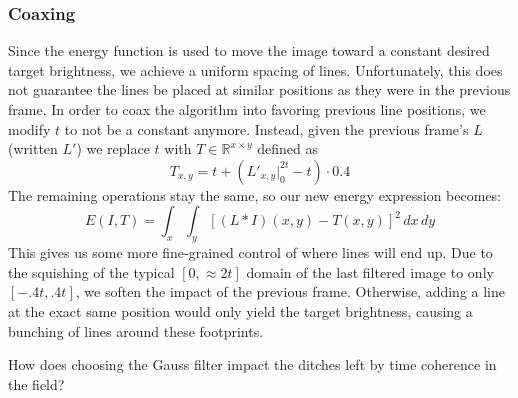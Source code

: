 \subsubsection*{Coaxing}
Since the energy function is used to move the image toward a constant desired target brightness, we achieve a uniform spacing of lines.
Unfortunately, this does not guarantee the lines be placed at similar positions as they were in the previous frame.
In order to coax the algorithm into favoring previous line positions, we modify $t$ to not be a constant anymore.
Instead, given the previous frame's $L$ (written $L'$) we replace $t$ with $T\in\mathbb{R}^{x\times y}$ defined as 
\begin{equation*}
    T_{x,y} = t + \left(L'_{x,y}\bigg|_0^{2t} - t\right) \cdot 0.4
\end{equation*}
The remaining operations stay the same, so our new energy expression becomes:
\[E(I, T) = \int_x\int_y\left[(L\ast I)(x,y)-T(x,y)\right]^2\,dx\,dy\]
This gives us some more fine-grained control of where lines will end up.
Due to the squishing of the typical $[0, \approx2t]$ domain of the last filtered image to only $[-.4t, .4t]$,
we soften the impact of the previous frame.
Otherwise, adding a line at the exact same position would only yield the target brightness,
causing a bunching of lines around these footprints.\\
\begin{minipage}{.5\textwidth}
    How does choosing the Gauss filter impact the ditches left by time coherence in the field? 
\end{minipage}
\begin{minipage}{.5\textwidth}
    
\end{minipage}


